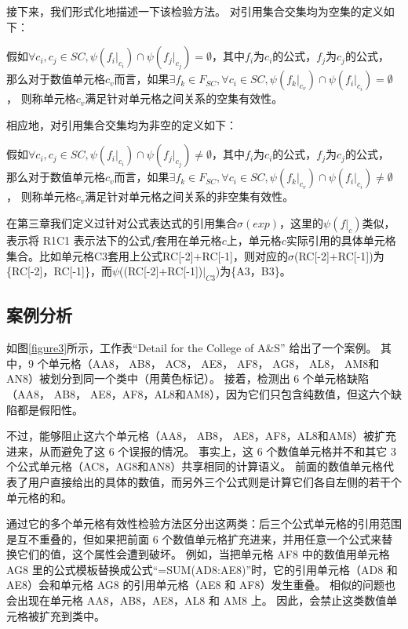 接下来，我们形式化地描述一下该检验方法。
对引用集合交集均为空集的定义如下：
\begin{definition}
    假如$\forall c_i,c_j \in SC,\psi(f_i|_{c_i}) \cap \psi(f_j|_{c_j}) = \emptyset$，其中$f_i$为$c_i$的公式，$f_j$为$c_j$的公式，
    那么对于数值单元格$c_v$而言，如果$\exists f_k \in F_{SC}, \forall c_i \in SC, \psi(f_k|_{c_v}) \cap \psi(f_i|_{c_i}) = \emptyset$，
    则称单元格$c_v$满足针对单元格之间关系的空集有效性。
\end{definition}

相应地，对引用集合交集均为非空的定义如下：
\begin{definition}
    假如$\forall c_i,c_j \in SC,\psi(f_i|_{c_i}) \cap \psi(f_j|_{c_j}) \neq \emptyset$，其中$f_i$为$c_i$的公式，$f_j$为$c_j$的公式，
    那么对于数值单元格$c_v$而言，如果$\exists f_k \in F_{SC}, \forall c_i \in SC, \psi(f_k|_{c_v}) \cap \psi(f_i|_{c_i}) \neq \emptyset$，
    则称单元格$c_v$满足针对单元格之间关系的非空集有效性。 
\end{definition}

在第三章我们定义过针对公式表达式的引用集合$\sigma(exp)$，这里的$\psi(f|_c)$类似，表示将 R1C1 表示法下的公式$f$套用在单元格$c$上，单元格$c$实际引用的具体单元格集合。比如单元格C3套用上公式RC[-2]+RC[-1]，则对应的$\sigma$(RC[-2]+RC[-1])为\{RC[-2]，RC[-1]\}，而$\psi$((RC[-2]+RC[-1])$|_{C3}$)为\{A3，B3\}。

\subsection{案例分析}

如图\ref{figure3}所示，工作表“Detail for the College of A\&S” 给出了一个案例。
其中，9 个单元格（AA8， AB8， AC8， AE8， AF8， AG8， AL8， AM8和AN8）被\cu 划分到同一个类中（用黄色标记）。
接着，\cu 检测出 6 个单元格缺陷（AA8， AB8， AE8，AF8，AL8和AM8），因为它们只包含纯数值，但这六个缺陷都是假阳性。

不过，\wa 能够阻止这六个单元格（AA8， AB8， AE8，AF8，AL8和AM8）被扩充进来，从而避免了这 6 个误报的情况。
事实上，这 6 个数值单元格并不和其它 3 个公式单元格（AC8，AG8和AN8）共享相同的计算语义。
前面的数值单元格代表了用户直接给出的具体的数值，而另外三个公式则是计算它们各自左侧的若干个单元格的和。

\wa 通过它的多个单元格有效性检验方法区分出这两类：后三个公式单元格的引用范围是互不重叠的，但如果把前面 6 个数值单元格扩充进来，并用任意一个公式来替换它们的值，这个属性会遭到破坏。
例如，当把单元格 AF8 中的数值用单元格 AG8 里的公式模板替换成公式“=SUM(AD8:AE8)”时，它的引用单元格（AD8 和 AE8）会和单元格 AG8 的引用单元格（AE8 和 AF8）发生重叠。
相似的问题也会出现在单元格 AA8，AB8，AE8，AL8 和 AM8 上。
因此，\wa 会禁止这类数值单元格被扩充到类中。


